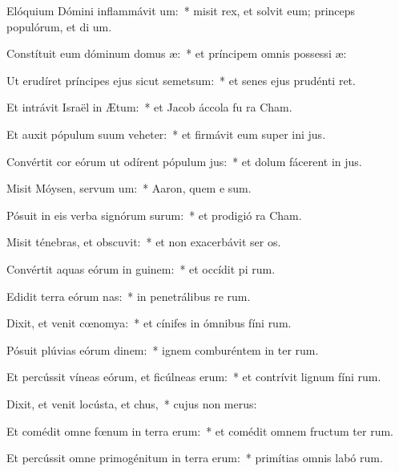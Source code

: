 \item Elóquium Dómini inflammávit um:~* misit rex, et solvit eum; princeps populórum, et di um.
\item Constítuit eum dóminum domus æ:~* et príncipem omnis possessi æ:
\item Ut erudíret príncipes ejus sicut semetsum:~* et senes ejus prudénti ret.
\item Et intrávit Israël in Ætum:~* et Jacob áccola fu  ra Cham.
\item Et auxit pópulum suum veheter:~* et firmávit eum super ini jus.
\item Convértit cor eórum ut odírent pópulum jus:~* et dolum fácerent in  jus.
\item Misit Móysen, servum um:~* Aaron, quem e sum.
\item Pósuit in eis verba signórum surum:~* et prodigió  ra Cham.
\item Misit ténebras, et obscuvit:~* et non exacerbávit ser os.
\item Convértit aquas eórum in guinem:~* et occídit pi rum.
\item Edidit terra eórum nas:~* in penetrálibus re rum.
\item Dixit, et venit cœnomya:~* et cínifes in ómnibus fíni rum.
\item Pósuit plúvias eórum dinem:~* ignem comburéntem in ter rum.
\item Et percússit víneas eórum, et ficúlneas erum:~* et contrívit lignum fíni rum.
\item Dixit, et venit locústa, et chus,~* cujus non  merus:
\item Et comédit omne fœnum in terra erum:~* et comédit omnem fructum ter rum.
\item Et percússit omne primogénitum in terra erum:~* primítias omnis labó rum.
